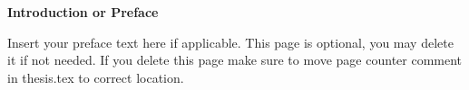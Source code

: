

\begin{center}

\vspace*{5\baselineskip}
\textbf{\large Introduction or Preface}
\end{center}


\begin{flushleft}
\hspace{10mm}Insert your preface text here if applicable. This page is optional, you may delete it if not needed. If you delete this page make sure to move page counter comment in thesis.tex to correct location. 
\end{flushleft}




